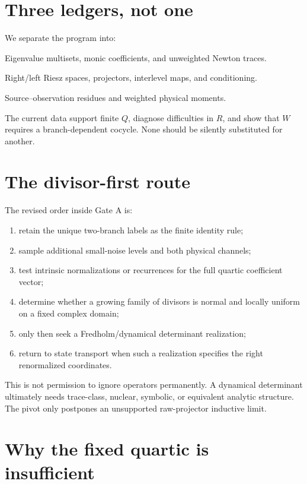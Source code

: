 \documentclass[12pt]{article}
\theoremstyle{remark}\newtheorem{remark}[theorem]{Remark}
\begin{document}
\section{Three ledgers, not one}

We separate the program into:
\begin{description}[leftmargin=2.8em,style=nextline]
\item[Divisor ledger $Q$]
Eigenvalue multisets, monic coefficients, and unweighted Newton traces.
\item[State ledger $R$]
Right/left Riesz spaces, projectors, interlevel maps, and conditioning.
\item[Transfer ledger $W$]
Source--observation residues and weighted physical moments.
\end{description}
The current data support finite $Q$, diagnose difficulties in $R$, and show
that $W$ requires a branch-dependent cocycle.  None should be silently
substituted for another.

\section{The divisor-first route}

The revised order inside Gate A is:
\begin{enumerate}[leftmargin=2em]
\item retain the unique two-branch labels as the finite identity rule;
\item sample additional small-noise levels and both physical channels;
\item test intrinsic normalizations or recurrences for the full quartic
coefficient vector;
\item determine whether a growing family of divisors is normal and locally
uniform on a fixed complex domain;
\item only then seek a Fredholm/dynamical determinant realization;
\item return to state transport when such a realization specifies the right
renormalized coordinates.
\end{enumerate}

This is not permission to ignore operators permanently.  A dynamical
determinant ultimately needs trace-class, nuclear, symbolic, or equivalent
analytic structure.  The pivot only postpones an unsupported raw-projector
inductive limit.

\section{Why the fixed quartic is insufficient}
\end{document}
